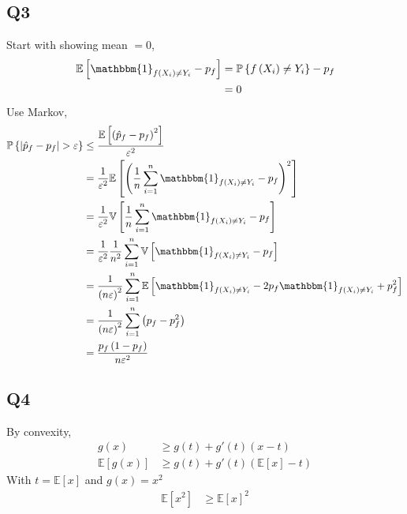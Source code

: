 \documentclass{article}
\begin{document}
\subsection{Q3}
Start with showing mean $= 0$,
\begin{align*}
\mathbb{E}\left[\mathbbm{1}_{f\left(X_{i}\right) \neq  Y_{i}} - p_{f}\right] &= \mathbb{P}\left\{f\left(X_{i}\right) \neq  Y_{i}\right\} - p_{f}
\\ &= 0
\end{align*}
Use Markov,
\begin{align*}
\mathbb{P}\left\{| \hat{p}_{f} - p_{f} | > \varepsilon\right\} &\leq  \dfrac{\mathbb{E}\left[\left(\hat{p}_{f} - p_{f}\right)^{2}\right]}{\varepsilon^{2}}
\\ &= \dfrac{1}{\varepsilon^{2}} \mathbb{E}\left[\left(\dfrac{1}{n} \displaystyle\sum_{i=1}^{n} \mathbbm{1}_{f\left(X_{i}\right) \neq  Y_{i}} - p_{f}\right)^{2}\right]
\\ &= \dfrac{1}{\varepsilon^{2}} \mathbb{V}\left[\dfrac{1}{n} \displaystyle\sum_{i=1}^{n} \mathbbm{1}_{f\left(X_{i}\right) \neq  Y_{i}} - p_{f}\right]
\\ &= \dfrac{1}{\varepsilon^{2}} \dfrac{1}{n^{2}} \displaystyle\sum_{i=1}^{n} \mathbb{V}\left[\mathbbm{1}_{f\left(X_{i}\right) \neq  Y_{i}} - p_{f}\right]
\\ &= \dfrac{1}{\left(n \varepsilon\right)^{2}} \displaystyle\sum_{i=1}^{n} \mathbb{E}\left[\mathbbm{1}_{f\left(X_{i}\right) \neq  Y_{i}} - 2 p_{f} \mathbbm{1}_{f\left(X_{i}\right) \neq  Y_{i}} + p_{f}^{2}\right]
\\ &= \dfrac{1}{\left(n \varepsilon\right)^{2}} \displaystyle\sum_{i=1}^{n} \left(p_{f} - p_{f}^{2}\right)
\\ &= \dfrac{p_{f} \left(1 - p_{f}\right)}{n \varepsilon^{2}}
\end{align*}


\subsection{Q4}
By convexity,
\begin{align*}
g\left(x\right)  &\geq  g\left(t\right) + g'\left(t\right)\left(x - t \right)
\\ \mathbb{E}\left[g\left(x\right)\right] &\geq  g\left(t\right) + g'\left(t\right)\left(\mathbb{E}\left[x\right] - t \right)
\end{align*}
With $t  = \mathbb{E}\left[x\right]$ and $g\left(x\right)  = x^{2}$
\begin{align*}
\mathbb{E}\left[x^{2}\right] &\geq  \mathbb{E}\left[x\right]^{2}
\end{align*}
\end{document}
